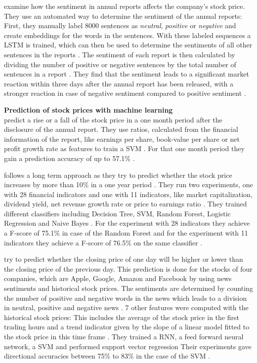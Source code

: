 \cite{Azimi2019} examine how the sentiment in annual reports affects the company's stock price.
They use an automated way to determine the sentiment of the annual reports:
First, they manually label 8000 sentences as \textit{neutral}, \textit{positive} or \textit{negative} and create embeddings for the words in the sentences.
With these labeled sequences a \ac{LSTM} is trained, which can then be used to determine the sentiments of all other sentences in the reports \cite[p. 12]{Azimi2019}.
The sentiment of each report is then calculated by dividing the number of positive or negative sentences by the total number of sentences in a report \cite[p. 15]{Azimi2019}.
They find that the sentiment leads to a significant market reaction within three days after the annual report has been released, with a stronger reaction in case of negative sentiment compared to positive sentiment \cite[pp. 17-18]{Azimi2019}.

\textbf{Prediction of stock prices with machine learning} \\
\cite{Heo2016} predict a rise or a fall of the stock price in a one month period after the disclosure of the annual report.
They use ratios, calculated from the financial information of the report, like earnings per share, book-value per share or net profit growth rate as features to train a \ac{SVM} \cite[p. 61]{Heo2016}.
For that one month period they gain a prediction accuracy of up to 57.1\% \cite[p. 63]{Heo2016}.

\cite{Milosevic2016} follows a long term approach as they try to predict whether the stock price increases by more than 10\% in a one year period \cite[pp. 4-5]{Milosevic2016}.
They run two experiments, one with 28 financial indicators and one with 11 indicators, like market capitalization, dividend yield, net revenue growth rate or price to earnings ratio \cite[pp. 3-4]{Milosevic2016}.
They trained different classifiers including Decision Tree, \ac{SVM}, Random Forest, Logistic Regression and Naive Bayes \cite[p. 5]{Moukalled2019}.
For the experiment with 28 indicators they achieve a F-score of 75.1\% in case of the Random Forest and for the experiment with 11 indicators they achieve a F-score of 76.5\% on the same classifier \cite[p. 7]{Milosevic2016}.

\cite{Moukalled2019} try to predict whether the closing price of one day will be higher or lower than the closing price of the previous day.
This prediction is done for the stocks of four companies, which are Apple, Google, Amazon and Facebook by using news sentiments and historical stock prices.
The sentiments are determined by counting the number of positive and negative words in the news which leads to a division in neutral, positive and negative news \cite[p. 5]{Moukalled2019}.
7 other features were computed with the historical stock prices:
This includes the average of the stock price in the first trading hours and a trend indicator given by the slope of a linear model fitted to the stock price in this time frame \cite[p. 5]{Moukalled2019}.
They trained a \ac{RNN}, a feed forward neural network, a \ac{SVM} and performed support vector regression
Their experiments gave directional accuracies between 75\% to 83\% in the case of the \ac{SVM} \cite[p. 8]{Moukalled2019}.

